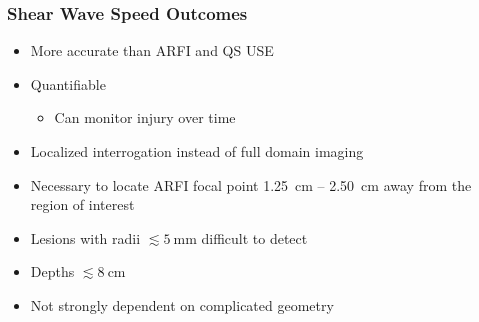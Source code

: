 \documentclass{beamer}
\begin{document}
		\begin{frame}
			\frametitle{Shear Wave Speed Outcomes}
			\begin{itemize}
				\item More accurate than ARFI and QS USE
				\item Quantifiable
				\begin{itemize}
					\item Can monitor injury over time
				\end{itemize}
				\item Localized  interrogation instead of full domain imaging
				\item Necessary to locate ARFI focal point \SI{1.25}{\cm} -- \SI{2.50}{\cm} away from the region of interest
				\item Lesions with radii $\lesssim \SI{5}{\mm}$ difficult to detect
				\item Depths $\lesssim \SI{8}{\cm}$
				\item Not strongly dependent on complicated geometry
			\end{itemize}
		\end{frame}
\end{document}
